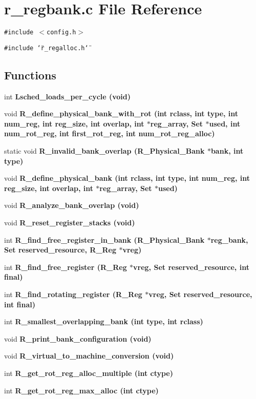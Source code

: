 \section{r\_\-regbank.c File Reference}
\label{r__regbank_8c}
{\tt \#include $<$config.h$>$}\par
{\tt \#include \char`\"{}r\_\-regalloc.h\char`\"{}}\par
\subsection*{Functions}
\begin{CompactItemize}
\item 
int \bf{Lsched\_\-loads\_\-per\_\-cycle} (void)
\item 
void \bf{R\_\-define\_\-physical\_\-bank\_\-with\_\-rot} (int rclass, int type, int num\_\-reg, int reg\_\-size, int overlap, int $\ast$reg\_\-array, \bf{Set} $\ast$used, int num\_\-rot\_\-reg, int first\_\-rot\_\-reg, int num\_\-rot\_\-reg\_\-alloc)
\item 
static void \bf{R\_\-invalid\_\-bank\_\-overlap} (\bf{R\_\-Physical\_\-Bank} $\ast$bank, int type)
\item 
void \bf{R\_\-define\_\-physical\_\-bank} (int rclass, int type, int num\_\-reg, int reg\_\-size, int overlap, int $\ast$reg\_\-array, \bf{Set} $\ast$used)
\item 
void \bf{R\_\-analyze\_\-bank\_\-overlap} (void)
\item 
void \bf{R\_\-reset\_\-register\_\-stacks} (void)
\item 
int \bf{R\_\-find\_\-free\_\-register\_\-in\_\-bank} (\bf{R\_\-Physical\_\-Bank} $\ast$reg\_\-bank, \bf{Set} reserved\_\-resource, \bf{R\_\-Reg} $\ast$vreg)
\item 
int \bf{R\_\-find\_\-free\_\-register} (\bf{R\_\-Reg} $\ast$vreg, \bf{Set} reserved\_\-resource, int final)
\item 
int \bf{R\_\-find\_\-rotating\_\-register} (\bf{R\_\-Reg} $\ast$vreg, \bf{Set} reserved\_\-resource, int final)
\item 
int \bf{R\_\-smallest\_\-overlapping\_\-bank} (int type, int rclass)
\item 
void \bf{R\_\-print\_\-bank\_\-configuration} (void)
\item 
void \bf{R\_\-virtual\_\-to\_\-machine\_\-conversion} (void)
\item 
int \bf{R\_\-get\_\-rot\_\-reg\_\-alloc\_\-multiple} (int ctype)
\item 
int \bf{R\_\-get\_\-rot\_\-reg\_\-max\_\-alloc} (int ctype)
\end{CompactItemize}


